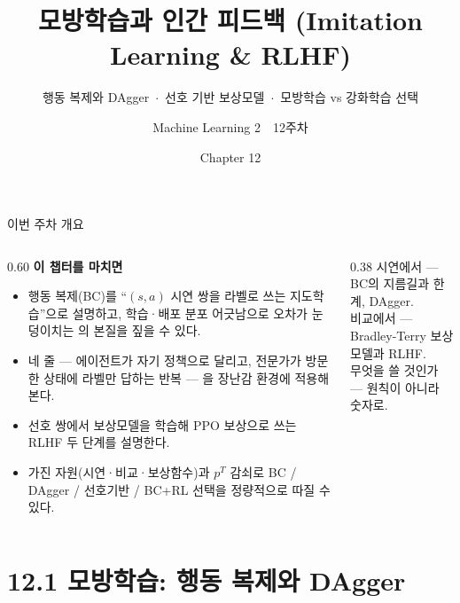 \documentclass[aspectratio=169,11pt]{beamer}
\title{모방학습과 인간 피드백 (Imitation Learning \& RLHF)}
\subtitle{행동 복제와 DAgger \,$\cdot$\, 선호 기반 보상모델 \,$\cdot$\, 모방학습 vs 강화학습 선택}
\author{Machine Learning 2 \,\textperiodcentered\, 12주차}
\institute{한국과학영재학교 (KSA)}
\date{Chapter 12}
\begin{document}
\begin{frame}
  \titlepage
\end{frame}

\begin{frame}{이번 주차 개요}
  \small
  \begin{columns}[T]
    \begin{column}{0.60\textwidth}
      \textbf{이 챕터를 마치면}
      \begin{itemize}
        \item 행동 복제(BC)를 ``$(s,a)$ 시연 쌍을 라벨로 쓰는
          지도학습''으로 설명하고, 학습·배포 분포 어긋남으로
          오차가 눈덩이치는 의 본질을 짚을 수 있다.
        \item {} 네 줄 — 에이전트가 자기 정책으로 달리고,
          전문가가 방문한 상태에 라벨만 답하는 반복 — 을 장난감
          환경에 적용해 본다.
        \item {} 선호 쌍에서 보상모델을 학습해
          PPO 보상으로 쓰는 RLHF 두 단계를 설명한다.
        \item 가진 자원(시연·비교·보상함수)과 \small$p^T$
          \normalsize 감쇠로 BC / DAgger / 선호기반 / BC+RL 선택을
          정량적으로 따질 수 있다.
      \end{itemize}
    \end{column}
    \begin{column}{0.38\textwidth}
       시연에서 — BC의 지름길과 한계, DAgger. \\[0.5em]
       비교에서 — Bradley-Terry 보상모델과 RLHF. \\[0.5em]
       무엇을 쓸 것인가 — 원칙이 아니라 숫자로.
    \end{column}
  \end{columns}
\end{frame}

\section{12.1 모방학습: 행동 복제와 DAgger}

\end{document}
